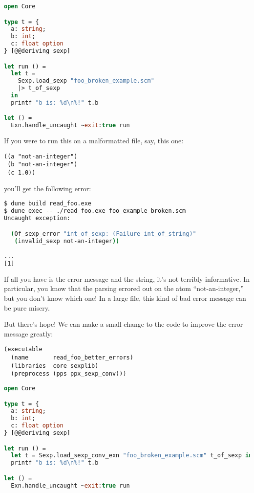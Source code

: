 \begin{lstlisting}[language=Caml]
open Core

type t = {
  a: string;
  b: int;
  c: float option
} [@@deriving sexp]

let run () =
  let t =
    Sexp.load_sexp "foo_broken_example.scm"
    |> t_of_sexp
  in
  printf "b is: %d\n%!" t.b

let () =
  Exn.handle_uncaught ~exit:true run
\end{lstlisting}

If you were to run this on a malformatted file, say, this one:

\begin{lstlisting}
((a "not-an-integer")
 (b "not-an-integer")
 (c 1.0))
\end{lstlisting}

you'll get the following error:

\begin{lstlisting}[language=bash]
$ dune build read_foo.exe
$ dune exec -- ./read_foo.exe foo_example_broken.scm
Uncaught exception:

  (Of_sexp_error "int_of_sexp: (Failure int_of_string)"
   (invalid_sexp not-an-integer))

...
[1]
\end{lstlisting}

If all you have is the error message and the string, it's not terribly
informative. In particular, you know that the parsing errored out on the
atom ``not-an-integer,'' but you don't know which one! In a large file,
this kind of bad error message can be pure misery.

But there's hope! We can make a small change to the code to improve the
error message greatly:

\begin{lstlisting}
(executable
  (name       read_foo_better_errors)
  (libraries  core sexplib)
  (preprocess (pps ppx_sexp_conv)))
\end{lstlisting}

\begin{lstlisting}[language=Caml]
open Core

type t = {
  a: string;
  b: int;
  c: float option
} [@@deriving sexp]

let run () =
  let t = Sexp.load_sexp_conv_exn "foo_broken_example.scm" t_of_sexp in
  printf "b is: %d\n%!" t.b

let () =
  Exn.handle_uncaught ~exit:true run
\end{lstlisting}

